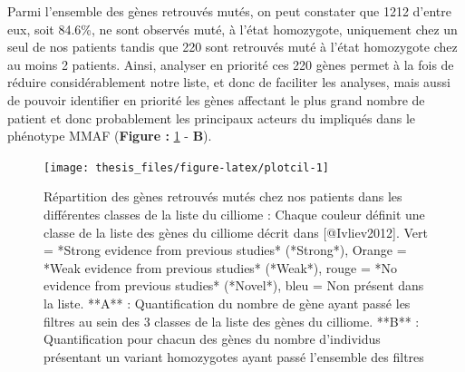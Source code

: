 \documentclass[12pt,twoside]{reedthesis}
\theoremstyle{definition}
\theoremstyle{definition}
\theoremstyle{remark}
\begin{document}
  Parmi l'ensemble des gènes retrouvés mutés, on peut constater que 1212
  d'entre eux, soit 84.6\%, ne sont observés muté, à l'état homozygote,
  uniquement chez un seul de nos patients tandis que 220 sont retrouvés
  muté à l'état homozygote chez au moins 2 patients. Ainsi, analyser en
  priorité ces 220 gènes permet à la fois de réduire considérablement
  notre liste, et donc de faciliter les analyses, mais aussi de pouvoir
  identifier en priorité les gènes affectant le plus grand nombre de
  patient et donc probablement les principaux acteurs du impliqués dans le
  phénotype MMAF (\textbf{Figure : }\ref{fig:plotcil} - \textbf{B}).
  
  \newpage 
  
  \begin{figure}
  
  {\centering \texttt{[image: thesis\_files/figure-latex/plotcil-1]} 
  
  }
  
  \caption[Répartition des gènes retrouvés mutés chez nos patients dans les différentes classes de la liste du cilliome]{Répartition des gènes retrouvés mutés chez nos patients dans les différentes classes de la liste du cilliome : Chaque couleur définit une classe de la liste des gènes du cilliome décrit dans [@Ivliev2012]. Vert = *Strong evidence from previous studies* (*Strong*), Orange = *Weak evidence from previous studies* (*Weak*), rouge = *No evidence from previous studies* (*Novel*), bleu = Non présent dans la liste. **A** : Quantification du nombre de gène ayant passé les filtres au sein des 3 classes de la liste des gènes du cilliome. **B** : Quantification pour chacun des gènes du nombre d'individus présentant un variant homozygotes ayant passé l'ensemble des filtres}\label{fig:plotcil}
  \end{figure}
  
  \newpage  
  
\end{document}
